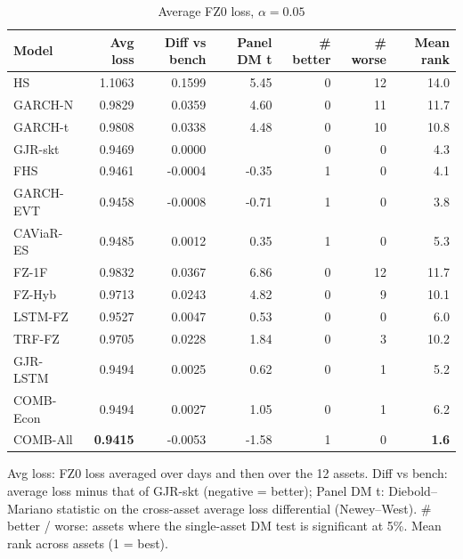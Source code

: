 \begin{table}[htbp]
\centering
\footnotesize
\caption{Average FZ0 loss, $\alpha=0.05$}
\label{tab:loss_a050}
\begin{tabular}{lrrrrrr}
\toprule
Model & Avg loss & Diff vs bench & Panel DM t & \# better & \# worse & Mean rank \\
\midrule
HS & 1.1063 & 0.1599 & 5.45 & 0 & 12 & 14.0 \\
GARCH-N & 0.9829 & 0.0359 & 4.60 & 0 & 11 & 11.7 \\
GARCH-t & 0.9808 & 0.0338 & 4.48 & 0 & 10 & 10.8 \\
GJR-skt & 0.9469 & 0.0000 &  & 0 & 0 & 4.3 \\
FHS & 0.9461 & -0.0004 & -0.35 & 1 & 0 & 4.1 \\
GARCH-EVT & 0.9458 & -0.0008 & -0.71 & 1 & 0 & 3.8 \\
CAViaR-ES & 0.9485 & 0.0012 & 0.35 & 1 & 0 & 5.3 \\
FZ-1F & 0.9832 & 0.0367 & 6.86 & 0 & 12 & 11.7 \\
FZ-Hyb & 0.9713 & 0.0243 & 4.82 & 0 & 9 & 10.1 \\
LSTM-FZ & 0.9527 & 0.0047 & 0.53 & 0 & 0 & 6.0 \\
TRF-FZ & 0.9705 & 0.0228 & 1.84 & 0 & 3 & 10.2 \\
GJR-LSTM & 0.9494 & 0.0025 & 0.62 & 0 & 1 & 5.2 \\
COMB-Econ & 0.9494 & 0.0027 & 1.05 & 0 & 1 & 6.2 \\
COMB-All & \textbf{0.9415} & -0.0053 & -1.58 & 1 & 0 & \textbf{1.6} \\
\bottomrule
\end{tabular}
\par\smallskip\parbox{\linewidth}{\scriptsize Avg loss: FZ0 loss averaged over days and then over the 12 assets. Diff vs bench: average loss minus that of GJR-skt (negative = better); Panel DM t: Diebold--Mariano statistic on the cross-asset average loss differential (Newey--West). \# better / worse: assets where the single-asset DM test is significant at 5\%. Mean rank across assets (1 = best).}
\end{table}